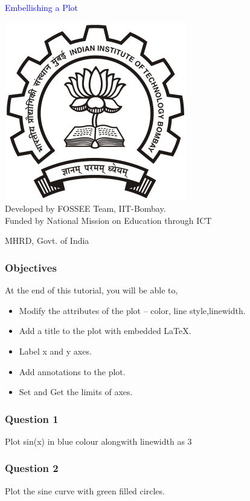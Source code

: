 \documentclass[presentation]{beamer}
\title{}
\author{FOSSEE}
\date{}
\begin{document}
\begin{frame}

\begin{center}
\textcolor{blue}{Embellishing a Plot}
\end{center}
\begin{center}
\includegraphics[scale=0.25]{../images/iitb-logo.png}\\
Developed by FOSSEE Team, IIT-Bombay. \\ 
Funded by National Mission on Education through ICT

MHRD, Govt. of India
\end{center}
\end{frame}
\begin{frame}
\frametitle{Objectives}
\label{sec-2}

  At the end of this tutorial, you will be able to, 

\begin{itemize}
\item Modify the attributes of the plot -- color, line style,linewidth.
\item Add a title to the plot with embedded \LaTeX{}.
\item Label x and y axes.
\item Add annotations to the plot.
\item Set and Get the limits of axes.
\end{itemize}
\end{frame}
\begin{frame}
\frametitle{Question 1}
\label{sec-3}

  Plot sin(x) in blue colour alongwith linewidth as 3
\end{frame}
\begin{frame}
\frametitle{Question 2}
\label{sec-4}

  Plot the sine curve with green filled circles.
\end{frame}
\end{document}
